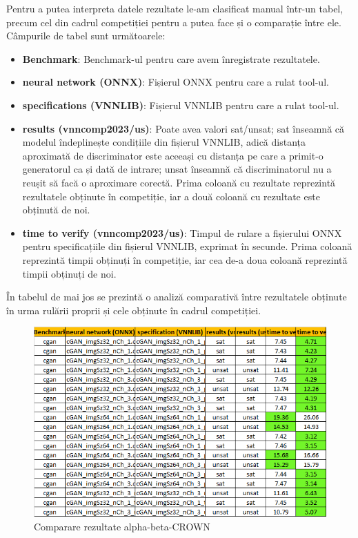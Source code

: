 Pentru a putea interpreta datele rezultate le-am clasificat manual într-un tabel, precum cel din cadrul competiției pentru a putea face și o comparație între ele. Câmpurile de tabel sunt următoarele:
\begin{itemize}
    \item \textbf{Benchmark}: Benchmark-ul pentru care avem înregistrate rezultatele.
    \item \textbf{neural network (ONNX)}: Fișierul ONNX pentru care a rulat tool-ul.
    \item \textbf{specifications (VNNLIB)}: Fișierul VNNLIB pentru care a rulat tool-ul.
    \item \textbf{results (vnncomp2023/us)}: Poate avea valori sat/unsat; sat înseamnă că modelul îndeplinește condițiile din fișierul VNNLIB, adică distanța aproximată de discriminator este aceeași cu distanța pe care a primit-o generatorul ca și dată de intrare; unsat înseamnă că discriminatorul nu a reușit să facă o aproximare corectă.
    Prima coloană cu rezultate reprezintă rezultatele obținute în competiție, iar a două coloană cu rezultate este obținută de noi.
    \item \textbf{time to verify (vnncomp2023/us)}: Timpul de rulare a fișierului ONNX pentru specificațiile din fișierul VNNLIB, exprimat în secunde. Prima coloană reprezintă timpii obținuți în competiție, iar cea de-a doua coloană reprezintă timpii obținuți de noi.
\end{itemize}

În tabelul de mai jos se prezintă o analiză comparativă între rezultatele obținute în urma rulării proprii și cele obținute în cadrul competiției.

\begin{figure}[h]
\centering 
\includegraphics[width=0.8\linewidth]{imagini/interpretare rezultate/abC_comp_vs_us.png}
\caption{Comparare rezultate alpha-beta-CROWN}
\label{fig:image1} 
\end{figure}
\

